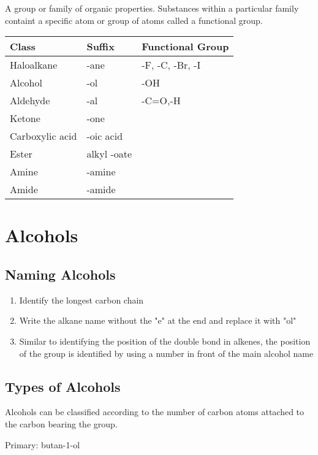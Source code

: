 	A group or family of organic properties. Substances within a particular family containt a specific atom or group of atoms called a functional group.

	\begin{table}[H]
		\centering
		\begin{tabular}{l|l|l}
			Class & Suffix & Functional Group \\ \hline
			Haloalkane & -ane & -F, -C, -Br, -I \\
			Alcohol & -ol & -OH \\
			Aldehyde & -al & -C=O,-H \\
			Ketone & -one & \\
			Carboxylic acid & -oic acid & \\
			Ester & alkyl -oate & \\
			Amine & -amine & \\
			Amide & -amide &
		\end{tabular}
	\end{table}

\section{Alcohols}


	\subsection{Naming Alcohols}
	
		\begin{enumerate}
			\item Identify the longest carbon chain
			\item Write the alkane name without the "e" at the end and replace it with "ol"
			\item Similar to identifying the position of the double bond in alkenes, the position of the  group is identified by using a number in front of the main alcohol name
		\end{enumerate}

	\subsection{Types of Alcohols}
		
		Alcohols can be classified according to the number of carbon atoms attached to the carbon bearing the  group.

		Primary: butan-1-ol

		\begin{center}
		\end{center}

